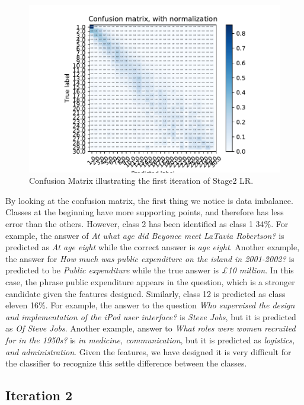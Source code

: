 \begin{figure}
  \includegraphics[scale=1]{../Figures/fig_iter1.pdf} \centering
  \caption{Confusion Matrix illustrating the first iteration of Stage2 LR. }
\end{figure} 



By looking at the confusion matrix, the first thing we notice is data imbalance. Classes at the beginning have more supporting points, and therefore has less error than the others. However, class 2 has been identified as class 1 34\%. For example, the answer of \textit{At what age did Beyonce meet LaTavia Robertson?} is predicted as \textit{At age eight} while the correct answer is \textit{age eight}. Another example, the answer for \textit{How much was public expenditure on the island in 2001-2002?} is predicted to be \textit{Public expenditure} while the true answer is \textit{£10 million}. In this case, the phrase public expenditure appears in the question, which is a stronger candidate given the features designed.
Similarly, class 12 is predicted as class eleven 16\%. For example, the answer to the question \textit{Who supervised the design and implementation of the iPod user interface?} is \textit{Steve Jobs}, but it is predicted as \textit{Of Steve Jobs}. Another example, answer to \textit{What roles were women recruited for in the 1950s?} is \textit{in medicine, communication}, but it is predicted as \textit{logistics, and administration}. Given the features, we have designed it is very difficult for the classifier to recognize this settle difference between the classes. 


\subsection{Iteration 2}

